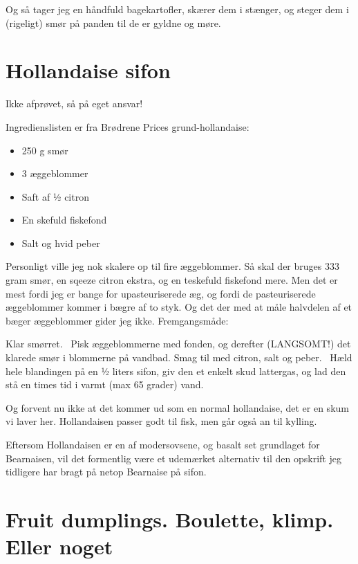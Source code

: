 \documentclass[
  letterpaper,
  DIV=11,
  numbers=noendperiod]{scrreprt}
\providecommand{\tightlist}{%
  \setlength{\itemsep}{0pt}\setlength{\parskip}{0pt}}\usepackage{longtable,booktabs,array}
\begin{document}
Og så tager jeg en håndfuld bagekartofler, skærer dem i stænger, og
steger dem i (rigeligt) smør på panden til de er gyldne og møre.

\hypertarget{hollandaise-sifon}{%
\section{Hollandaise sifon}\label{hollandaise-sifon}}

Ikke afprøvet, så på eget ansvar!~

Ingredienslisten er fra Brødrene Prices grund-hollandaise:

\begin{itemize}
\tightlist
\item
  250 g smør
\item
  3 æggeblommer
\item
  Saft af ½ citron
\item
  En skefuld fiskefond
\item
  Salt og hvid peber
\end{itemize}

Personligt ville jeg nok skalere op til fire æggeblommer. Så skal der
bruges 333 gram smør, en sqeeze citron ekstra, og en teskefuld fiskefond
mere. Men det er mest fordi jeg er bange for upasteuriserede æg, og
fordi de pasteuriserede æggeblommer kommer i bægre af to styk. Og det
der med at måle halvdelen af et bæger æggeblommer gider jeg ikke.
Fremgangsmåde:

Klar smørret.~ Pisk æggeblommerne med fonden, og derefter (LANGSOMT!)
det klarede smør i blommerne på vandbad. Smag til med citron, salt og
peber.~ Hæld hele blandingen på en ½ liters sifon, giv den et enkelt
skud lattergas, og lad den stå en times tid i varmt (max 65 grader)
vand.

Og forvent nu ikke at det kommer ud som en normal hollandaise, det er en
skum vi laver her. Hollandaisen passer godt til fisk, men går også an
til kylling.

Eftersom Hollandaisen er en af modersovsene, og basalt set grundlaget
for Bearnaisen, vil det formentlig være et udemærket alternativ til den
opskrift jeg tidligere har bragt på netop Bearnaise på sifon.

\hypertarget{fruit-dumplings.-boulette-klimp.-eller-noget}{%
\section{Fruit dumplings. Boulette, klimp. Eller
noget}\label{fruit-dumplings.-boulette-klimp.-eller-noget}}
\end{document}
